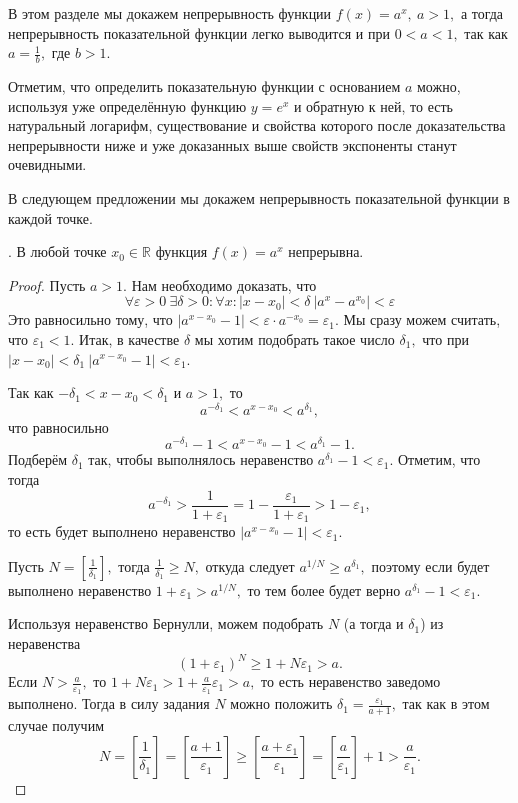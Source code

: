 В этом разделе мы докажем непрерывность
функции $f(x)=a^x, \ a>1,$ а тогда
непрерывность показательной функции легко
выводится и при $0<a<1,$ так как
$a=\frac{1}{b},$ где $b>1.$

Отметим, что определить показательную
функции с основанием $a$ можно,
используя уже определённую функцию $y=e^x$
и обратную к ней, то есть натуральный
логарифм, существование и свойства
которого после доказательства непрерывности
ниже и уже доказанных выше свойств экспоненты
станут очевидными.

В следующем предложении мы докажем непрерывность
показательной функции в каждой точке.
\begin{proposition}.
    В любой точке
    $x_0 \in \mathbb R$ функция $f(x)=a^x$ непрерывна.
\end{proposition}
\begin{proof}
    Пусть $a > 1$. Нам необходимо доказать, что
    $$
        \forall \varepsilon>0 \ \exists \delta>0:
        \forall x: |x-x_0|<\delta \ |a ^x - a^{x_0}| <
        \varepsilon
    $$
    Это равносильно тому, что $|a^{x - x_0} - 1|
        < \varepsilon \cdot a^{-x_0} = \varepsilon_1$.
    Мы сразу можем считать, что $\varepsilon_1 < 1$.
    Итак, в качестве $\delta$ мы хотим подобрать
    такое число $\delta_1,$ что
    при $|x - x_0|< \delta_1 \ |a^{x - x_0}-1|<\varepsilon_1.$

    Так как $-\delta_1 < x - x_0 < \delta_1$
    и $a>1,$ то
    $$
        a^{-\delta_1} < a^{x - x_0} < a^{\delta_1},
    $$
    что равносильно
    $$
        a^{-\delta_1} - 1 < a^{x - x_0} - 1 < a^{\delta_1} - 1.
    $$
    Подберём $\delta_1$ так, чтобы
    выполнялось неравенство
    $a^{\delta_1} - 1 < \varepsilon_1.$
    Отметим, что тогда
    $$
        a^{-\delta_1}>
        \frac{1}{1+\varepsilon_1} = 1 - \frac{\varepsilon_1}
        {1 + \varepsilon_1} > 1 - \varepsilon_1,
    $$
    то есть будет выполнено неравенство
    $|a^{x - x_0}-1|<\varepsilon_1.$

    Пусть $N = \left[\frac{1}{\delta_1}\right],$
    тогда $\frac{1}{\delta_1} \geq N,$ откуда
    следует $a^{1/N} \geq a^{\delta_1},$
    поэтому если будет выполнено неравенство
    $1 + \varepsilon_1>a^{1/N},$ то
    тем более будет верно
    $a^{\delta_1} - 1 < \varepsilon_1.$

    Используя неравенство
    Бернулли, можем подобрать $N$ (а тогда и $\delta_1$)
    из неравенства
    $$
        (1 + \varepsilon_1)^N \geq 1 + N\varepsilon_1>a.
    $$
    Если $N>\frac{a}{\varepsilon_1},$ то
    $1 + N\varepsilon_1 > 1 +
        \frac{a}{\varepsilon_1}\varepsilon_1 > a,$
    то есть неравенство
    заведомо выполнено. Тогда
    в силу задания $N$ можно положить
    $\delta_1 =\frac{\varepsilon_1}{a+1},$
    так как в этом случае получим
    $$
        N = \left[\frac{1}{\delta_1}\right] = \left[\frac{a+1}{\varepsilon_1}\right]
        \geq \left[\frac{a + \varepsilon_1}{\varepsilon_1}\right] =
        \left[\frac{a}{\varepsilon_1}\right]+1 > \frac{a}{\varepsilon_1}.
    $$


\end{proof}
